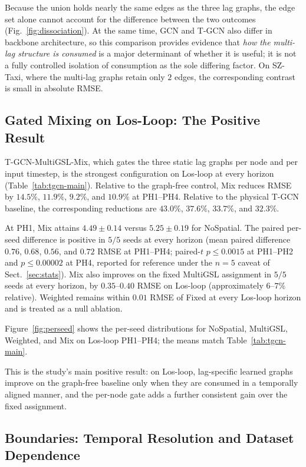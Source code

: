 Because the union holds nearly the same edges as the three lag graphs, the
edge set alone cannot account for the difference between the two outcomes
(Fig.~\ref{fig:dissociation}).
At the same time, GCN and T-GCN also differ in backbone architecture, so
this comparison provides evidence that \emph{how the multi-lag structure is
consumed} is a major determinant of whether it is useful; it is not a fully
controlled isolation of consumption as the sole differing factor. On
SZ-Taxi, where the multi-lag graphs retain only $2$ edges, the corresponding
contrast is small in absolute RMSE.

\subsection{Gated Mixing on Los-Loop: The Positive Result}\label{sec:res-mix}

T-GCN-MultiGSL-Mix, which gates the three static lag graphs per node and per
input timestep, is the strongest configuration on Los-loop at every horizon
(Table~\ref{tab:tgcn-main}). Relative to the graph-free control, Mix reduces
RMSE by $14.5\%$, $11.9\%$, $9.2\%$, and $10.9\%$ at PH1--PH4. Relative to
the physical T-GCN baseline, the corresponding reductions are $43.0\%$,
$37.6\%$, $33.7\%$, and $32.3\%$.

At PH1, Mix attains $4.49\pm 0.14$ versus $5.25\pm 0.19$ for NoSpatial. The
paired per-seed difference is positive in $5/5$ seeds at every horizon
(mean paired difference $0.76$, $0.68$, $0.56$, and $0.72$ RMSE at
PH1--PH4; paired-$t$ $p\le 0.0015$ at PH1--PH2 and $p\le 0.00002$ at PH4,
reported for reference under the $n=5$ caveat of Sect.~\ref{sec:stats}).
Mix also improves on the fixed MultiGSL assignment in $5/5$ seeds at every
horizon, by $0.35$--$0.40$ RMSE on Los-loop (approximately $6$--$7\%$
relative). Weighted remains within $0.01$ RMSE of Fixed at every Los-loop
horizon and is treated as a null ablation.

Figure~\ref{fig:perseed} shows the per-seed distributions
for NoSpatial, MultiGSL, Weighted, and Mix on Los-loop PH1--PH4; the means
match Table~\ref{tab:tgcn-main}.

This is the study's main positive result: on Los-loop, lag-specific learned
graphs improve on the graph-free baseline only when they are consumed in a
temporally aligned manner, and the per-node gate adds a further consistent
gain over the fixed assignment.

\subsection{Boundaries: Temporal Resolution and Dataset Dependence}\label{sec:res-boundaries}

